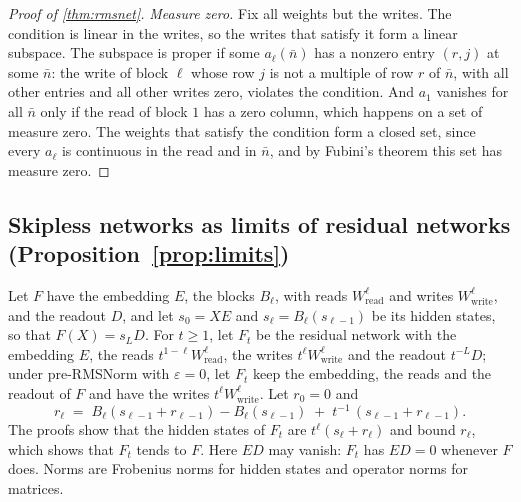 \documentclass[10pt]{article}
\theoremstyle{definition}
\theoremstyle{remark}
\newcommand{\Wread}{W_{\mathrm{read}}}
\newcommand{\Wwrite}{W_{\mathrm{write}}}
\begin{document}
\begin{proof}[Proof of \cref{thm:rmsnet}]
\emph{Measure zero.} Fix all weights but the writes. The condition is linear in the writes, so the writes that satisfy it form a linear subspace. The subspace is proper if some $a_\ell(\bar n)$ has a nonzero entry $(r, j)$ at some $\bar n$: the write of block $\ell$ whose row $j$ is not a multiple of row $r$ of $\bar n$, with all other entries and all other writes zero, violates the condition. And $a_1$ vanishes for all $\bar n$ only if the read of block $1$ has a zero column, which happens on a set of measure zero. The weights that satisfy the condition form a closed set, since every $a_\ell$ is continuous in the read and in $\bar n$, and by Fubini's theorem this set has measure zero.
\end{proof}


\subsection{Skipless networks as limits of residual networks\texorpdfstring{ (Proposition~\ref*{prop:limits})}{}}\label{app:prf-limits}

\propLimits*

Let $F$ have the embedding $E$, the blocks $B_\ell$, with reads $\Wread^{\ell}$ and writes $\Wwrite^{\ell}$, and the readout $D$, and let $s_0 = XE$ and $s_\ell = B_\ell(s_{\ell-1})$ be its hidden states, so that $F(X) = s_LD$. For $t \ge 1$, let $F_t$ be the residual network with the embedding $E$, the reads $t^{1-\ell}\Wread^{\ell}$, the writes $t^{\ell}\Wwrite^{\ell}$ and the readout $t^{-L}D$; under pre-RMSNorm with $\varepsilon = 0$, let $F_t$ keep the embedding, the reads and the readout of $F$ and have the writes $t^{\ell}\Wwrite^{\ell}$. Let $r_0 = 0$ and
\begin{equation}\label{eq:limit-rec}
r_\ell \;=\; B_\ell(s_{\ell-1} + r_{\ell-1}) - B_\ell(s_{\ell-1}) \;+\; t^{-1}\,(s_{\ell-1} + r_{\ell-1}).
\end{equation}
The proofs show that the hidden states of $F_t$ are $t^\ell(s_\ell + r_\ell)$ and bound $r_\ell$, which shows that $F_t$ tends to $F$. Here $ED$ may vanish: $F_t$ has $ED = 0$ whenever $F$ does. Norms are Frobenius norms for hidden states and operator norms for matrices.
\end{document}
